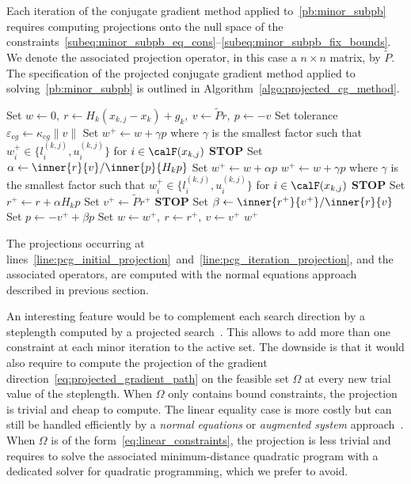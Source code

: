 Each iteration of the conjugate gradient method applied to~\eqref{pb:minor_subpb} requires computing projections onto the null space of the constraints~\eqref{subeq:minor_subpb_eq_cons}--\eqref{subeq:minor_subpb_fix_bounds}. We denote the associated projection operator, in this case a $n\times n$ matrix, by $\tilde{P}$. The specification of the projected conjugate gradient method applied to solving~\eqref{pb:minor_subpb} is outlined in Algorithm~\ref{algo:projected_cg_method}.
\begin{algorithm}
	\caption{The projected conjugate gradient method applied to~\eqref{pb:minor_subpb}}\label{algo:projected_cg_method}
	\begin{algorithmic}[1]
		\State\label{line:pcg_initial_projection}Set $w \gets 0,\ r \gets H_k(x_{k,j}-x_k)+g_k,\ v\gets \tilde{P}r,\ p \gets -v$
		\State Set tolerance $\varepsilon_{cg} \gets \kappa_{cg}\|v\|$
		\Repeat
		\State Set $w^+ \gets w + \gamma p$ where $\gamma$ is the smallest factor such that $w^+_i \in \{l^{(k,j)}_i,u^{(k,j)}_i\}$ 
		\State for $i \in \calF(x_{k,j})$
		\State \textbf{STOP}
		\EndIf
		\State Set $\alpha \gets \inner{r}{v} / \inner{p}{H_kp}$
		\State Set $w^+ \gets w+\alpha p$
		\State $w^+ \gets w + \gamma p$ where $\gamma$ is the smallest factor such that $w^+_i \in \{l^{(k,j)}_i,u^{(k,j)}_i\}$
		\State for $i \in \calF(x_{k,j})$
		\State \textbf{STOP}
		\EndIf
		\State Set $r^+ \gets r + \alpha H_kp$
		\State\label{line:pcg_iteration_projection} Set $v^+\gets \tilde{P}r^+$
		 \textbf{STOP}
		\EndIf
		\State Set $\beta \gets \inner{r^+}{v^+} / \inner{r}{v}$ 
		\State Set $p \gets -v^+ + \beta p$
		\State Set $w\gets w^+,\ r \gets r^+,\ v \gets v^+$
		\State{}
		\Return $w^+$
	\end{algorithmic}
\end{algorithm} 
The projections occurring at lines~\ref{line:pcg_initial_projection}~and~\ref{line:pcg_iteration_projection}, and the associated operators, are computed with the normal equations approach described in previous section.

An interesting feature would be to complement each search direction by a steplength computed by a projected search~\cite{moretoraldo:1991,linmore:1999a}. This allows to add more than one constraint at each minor iteration to the active set. The downside is that it would also require to compute the projection of the gradient direction~\eqref{eq:projected_gradient_path} on the feasible set $\Omega$ at every new trial value of the steplength. When $\Omega$ only contains bound constraints, the projection is trivial and cheap to compute. The linear equality case is more costly but can still be handled efficiently by a \textit{normal equations} or \textit{augmented system} approach~\cite{gould-etal:2001}. When $\Omega$ is of the form~\eqref{eq:linear_constraints}, the projection is less trivial and requires to solve the associated minimum-distance quadratic program with a dedicated solver for quadratic programming, which we prefer to avoid.

